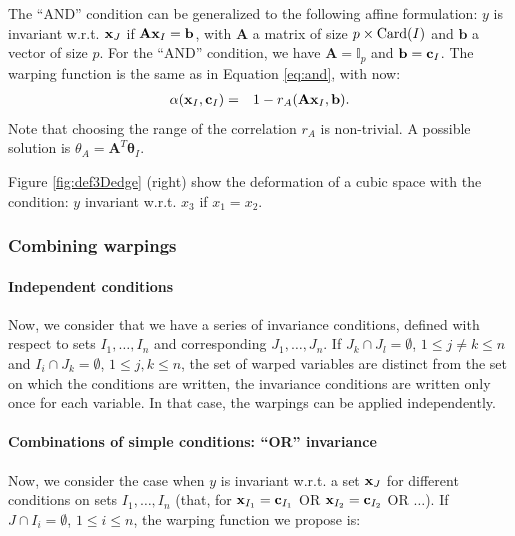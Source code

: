 	The ``AND'' condition can be generalized to the following affine formulation: 
	$y$ is invariant w.r.t. $\mathbf{x}_J$ if $\mathbf{A} \mathbf{x}_I = \mathbf{b}$, 
	with $\mathbf{A}$ a matrix of size $p \times \operatorname{Card}(I)$ and $\mathbf{b}$ a vector of size $p$.
	For the ``AND'' condition, we have $\mathbf{A} = \mathbb{I}_p$ and $\mathbf{b}=\mathbf{c}_I$.
	The warping function is the same as in Equation \ref{eq:and}, with now:
	\begin{eqnarray}
	\alpha(\mathbf{x}_I,  \mathbf{c}_I) &=& 1 - r_A(\mathbf{A} \mathbf{x}_I, \mathbf{b}).\label{eq:aff}
	\end{eqnarray}
	Note that choosing the range of the correlation $r_A$ is non-trivial. A possible solution is $\theta_A = \mathbf{A}^T \boldsymbol{\theta}_I$.
	
	Figure \ref{fig:def3Dedge} (right) show the deformation of a cubic space with the condition: $y$ invariant w.r.t. $x_3$ if $x_1 = x_2$. 
	
	\subsubsection{Combining warpings}
	
	\paragraph{Independent conditions}
	Now, we consider that we have a series of invariance conditions, defined with respect to sets $I_1, \ldots, I_n$ and corresponding $J_1, \ldots, J_n$.
	If $J_k\cap J_l=\emptyset$, $1 \leq j\neq k \leq n$ and $I_i\cap J_k = \emptyset$,  $1 \leq j,k \leq n$,
	the set of warped variables are distinct from the set on which the conditions are written, 
	the invariance conditions are written only once for each variable. In that case, 
	the warpings can be applied independently.
	
	\paragraph{Combinations of simple conditions: ``OR'' invariance}
	Now, we consider the case when $y$ is invariant w.r.t. a set $\mathbf{x}_J$ for different conditions on sets $I_1, \ldots, I_n$
	(that, for $\mathbf{x}_{I_1}=\mathbf{c}_{I_1}$ OR $\mathbf{x}_{I_2}=\mathbf{c}_{I_2}$ OR $\ldots$).
	If $J\cap I_i=\emptyset$, $1 \leq i \leq n$, the warping function we propose is:
	
